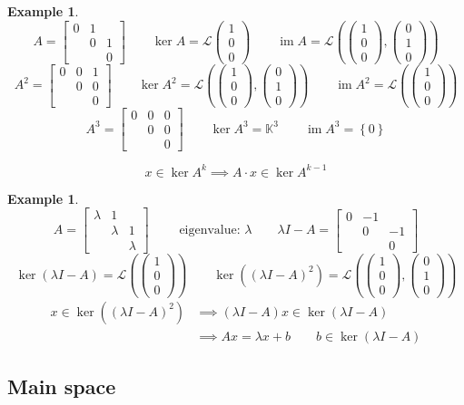 \documentclass{article}
\newcounter{lecref}[section]
\numberwithin{lecref}{section}
\newtheorem{example}[lecref]{Example}
\newcommand{\set}[1]{\left\{#1\right\}}
\newcommand{\vecthree}[3]{\begin{pmatrix} #1 \\ #2 \\ #3 \end{pmatrix}}
\DeclareMathOperator{\im}{im}
\begin{document}
\begin{example} %
  \[ A = \begin{bmatrix} 0 & 1 & \\ & 0 & 1 \\ & &  0 \end{bmatrix}
     \qquad \ker{A} = \mathcal L\vecthree 100
     \qquad \im{A} = \mathcal L\left(\vecthree 100, \vecthree 010\right) \]
  \[ A^2 = \begin{bmatrix} 0 & 0 & 1 \\ & 0 & 0 \\ & &  0 \end{bmatrix}
     \qquad \ker{A^2} = \mathcal L\left(\vecthree 100, \vecthree 010\right)
     \qquad \im{A^2} = \mathcal L\left(\vecthree 100\right) \]
  \[ A^3 = \begin{bmatrix} 0 & 0 & 0 \\ & 0 & 0 \\ & &  0 \end{bmatrix}
     \qquad \ker{A^3} = \mathbb K^3
     \qquad \im{A^3} = \set{0} \]

  \begin{mdframed}
    \[ x \in \ker{A^k} \implies A \cdot x \in \ker{A^{k-1}} \]
  \end{mdframed}
\end{example}

\begin{example}
  \[
    A = \begin{bmatrix} \lambda & 1 &  \\ & \lambda & 1 \\ & & \lambda \end{bmatrix}
    \qquad \text{ eigenvalue: } \lambda
    \qquad \lambda I - A = \begin{bmatrix} 0 & -1 & \\ & 0 & -1 \\ & & 0 \end{bmatrix}
  \]
  \[
    \ker(\lambda I - A) = \mathcal L\left(\vecthree 100\right)
    \qquad \ker((\lambda I - A)^2) = \mathcal L\left(\vecthree 100, \vecthree 010\right)
  \]
  \begin{align*}
    x \in \ker((\lambda I - A)^2)
      &\implies (\lambda I - A) x \in \ker(\lambda I - A) \\
      &\implies Ax = \lambda x + b \qquad b \in \ker(\lambda I - A)
  \end{align*}
\end{example}

\subsection{Main space}
\end{document}
